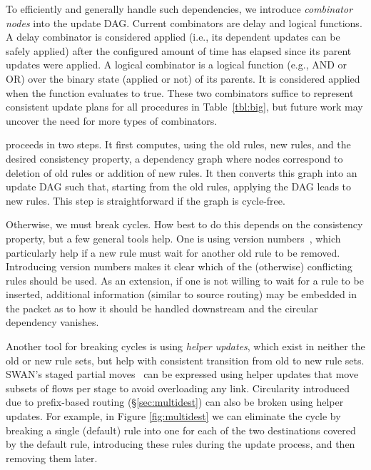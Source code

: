 To efficiently and generally handle such dependencies, we introduce {\em combinator nodes} into the update DAG. Current combinators are delay and logical functions. A delay combinator is considered applied (i.e., its dependent updates can be safely applied) after the configured amount of time has elapsed since its parent updates were applied. A logical combinator is a logical function (e.g., AND or OR) over the binary state (applied or not) of its parents. It is considered applied when the function evaluates to true. These two combinators suffice to represent consistent update plans for all procedures in Table~\ref{tbl:big}, but future work may uncover the need for more types of combinators.

 proceeds in two steps. It first computes, using the old rules, new rules, and the desired consistency property, a dependency graph where nodes correspond to deletion of old rules or addition of new rules. It then converts this graph into an update DAG such that, starting from the old rules, applying the DAG leads to new rules. This step is straightforward if the graph is cycle-free.

Otherwise, we must break cycles. How best to do this depends on the consistency property, but a few general tools help. One is using version numbers~\cite{safeupdate}, which particularly help if a new rule must wait for another old rule to be removed. Introducing version numbers makes it clear which of the (otherwise) conflicting rules should be used. As an extension, if one is not willing to wait for a rule to be inserted, additional information (similar to source routing) may be embedded in the packet as to how it should be handled downstream  and the circular dependency vanishes.

Another tool for breaking cycles is using {\em helper updates}, which exist in neither the old or new rule sets, but help with consistent transition from old to new rule sets. SWAN's staged partial moves~\cite{swan} can be expressed using helper updates that move subsets of flows per stage to avoid overloading any link. Circularity introduced due to prefix-based routing (\S\ref{sec:multidest}) can also be broken using helper updates. For example, in Figure \ref{fig:multidest} we can eliminate the cycle by breaking a single (default) rule into one for each of the two destinations covered by the default rule, introducing these rules during the update process, and then removing them later.

